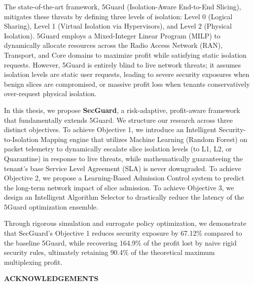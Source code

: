 \documentclass[12pt]{article}
\begin{document}
The state-of-the-art framework, 5Guard (Isolation-Aware End-to-End Slicing), mitigates these threats by defining three levels of isolation: Level 0 (Logical Sharing), Level 1 (Virtual Isolation via Hypervisors), and Level 2 (Physical Isolation). 5Guard employs a Mixed-Integer Linear Program (MILP) to dynamically allocate resources across the Radio Access Network (RAN), Transport, and Core domains to maximize profit while satisfying static isolation requests. However, 5Guard is entirely blind to live network threats; it assumes isolation levels are static user requests, leading to severe security exposures when benign slices are compromised, or massive profit loss when tenants conservatively over-request physical isolation.

In this thesis, we propose \textbf{SecGuard}, a risk-adaptive, profit-aware framework that fundamentally extends 5Guard. We structure our research across three distinct objectives. To achieve Objective 1, we introduce an Intelligent Security-to-Isolation Mapping engine that utilizes Machine Learning (Random Forest) on packet telemetry to dynamically escalate slice isolation levels (to L1, L2, or Quarantine) in response to live threats, while mathematically guaranteeing the tenant's base Service Level Agreement (SLA) is never downgraded. To achieve Objective 2, we propose a Learning-Based Admission Control system to predict the long-term network impact of slice admission. To achieve Objective 3, we design an Intelligent Algorithm Selector to drastically reduce the latency of the 5Guard optimization ensemble. 

Through rigorous simulation and surrogate policy optimization, we demonstrate that SecGuard's Objective 1 reduces security exposure by 67.12\% compared to the baseline 5Guard, while recovering 164.9\% of the profit lost by naive rigid security rules, ultimately retaining 90.4\% of the theoretical maximum multiplexing profit.
\clearpage



\begin{center}
    \textbf{\Large ACKNOWLEDGEMENTS}
\end{center}

\setlength{\parskip}{0.7em}

\noindent
\end{document}
